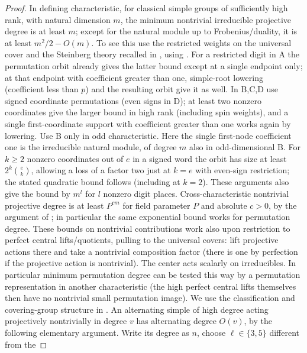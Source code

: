 \begin{proof}

In defining characteristic, for classical simple groups of sufficiently high rank, with natural dimension
\(m\), the minimum nontrivial irreducible projective degree is at least \(m\); except for the natural
module up to Frobenius/duality, it is at least \(m^2/2-O(m)\). To see this use the restricted weights on
the universal cover and the Steinberg theory recalled in , using
\citet{Steinberg1963,Jantzen2003}. For a restricted digit in A the permutation orbit already
gives the latter bound except at a single endpoint only; at that endpoint with coefficient greater than
one, simple-root lowering (coefficient less than \(p\)) and the resulting orbit give it as well. In B,C,D
use signed coordinate permutations (even signs in D); at least two nonzero coordinates give the larger
bound in high rank (including spin weights), and a single first-coordinate support with coefficient
greater than one works again by lowering. Use B only in odd characteristic. Here the single first-node
coefficient one is the irreducible natural module, of degree \(m\) also in odd-dimensional B. For
\(k\ge2\) nonzero coordinates out of \(e\) in a signed word the orbit has size at least \(2^k\binom e
k\), allowing a loss of a factor two just at \(k=e\) with even-sign restriction; the stated quadratic
bound follows (including at \(k=2\)). These arguments also give the bound by \(m^l\) for \(l\) nonzero
digit places. Cross-characteristic nontrivial projective degree is at least \(P^{c m}\) for field
parameter \(P\) and absolute \(c>0\), by the argument of ; in particular the same exponential bound
works for permutation degree. These bounds on nontrivial contributions work also upon restriction to
perfect central lifts/quotients, pulling to the universal covers: lift projective actions there and take
a nontrivial composition factor (there is one by perfection if the projective action is nontrivial). The
center acts scalarly on irreducibles. In particular minimum permutation degree can be tested this way by
a permutation representation in another characteristic (the high perfect central lifts themselves then
have no nontrivial small permutation image). We use the classification and covering-group structure in
. An alternating simple of high degree acting projectively nontrivially in
degree \(v\)
has alternating degree \(O(v)\), by the following elementary argument.
Write its degree as \(n\), choose \(\ell\in\{3,5\}\) different from the

\end{proof}
